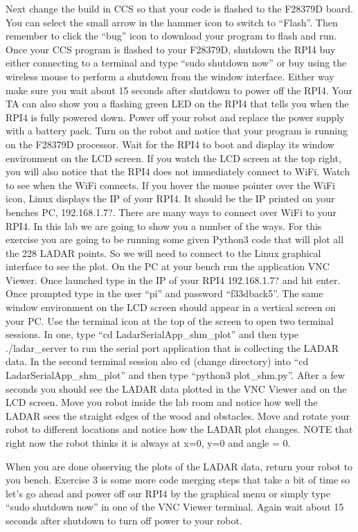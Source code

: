 \documentclass[11pt]{article}
\begin{document}
Next change the build in CCS so that your code is flashed to the F28379D board. You can select the small arrow in the hammer icon to switch to “Flash”. Then remember to click the “bug” icon to download your program to flash and run. Once your CCS program is flashed to your F28379D, shutdown the RPI4 buy either connecting to a terminal and type “sudo shutdown now” or buy using the wireless mouse to perform a shutdown from the window interface. Either way make sure you wait about 15 seconds after shutdown to power off the RPI4. Your TA can also show you a flashing green LED on the RPI4 that tells you when the RPI4 is fully powered down. Power off your robot and replace the power supply with a battery pack. Turn on the robot and notice that your program is running on the F28379D processor. Wait for the RPI4 to boot and display its window environment on the LCD screen. If you watch the LCD screen at the top right, you will also notice that the RPI4 does not immediately connect to WiFi. Watch to see when the WiFi connects. If you hover the mouse pointer over the WiFi icon, Linux displays the IP of your RPI4. It should be the IP printed on your benches PC, 192.168.1.7?. There are many ways to connect over WiFi to your RPI4. In this lab we are going to show you a number of the ways. For this exercise you are going to be running some given Python3 code that will plot all the 228 LADAR points. So we will need to connect to the Linux graphical interface to see the plot. On the PC at your bench run the application VNC Viewer. Once launched type in the IP of your RPI4 192.168.1.7? and hit enter. Once prompted type in the user “pi” and password “f33dback5”. The same window environment on the LCD screen should appear in a vertical screen on your PC. Use the terminal icon at the top of the screen to open two terminal sessions. In one, type “cd LadarSerialApp\_shm\_plot” and then type ./ladar\_server to run the serial port application that is collecting the LADAR data. In the second terminal session also cd (change directory) into “cd LadarSerialApp\_shm\_plot” and then type “python3 plot\_shm.py”. After a few seconds you should see the LADAR data plotted in the VNC Viewer and on the LCD screen. Move you robot inside the lab room and notice how well the LADAR sees the straight edges of the wood and obstacles. Move and rotate your robot to different locations and notice how the LADAR plot changes. NOTE that right now the robot thinks it is always at x=0, y=0 and angle = 0.

When you are done observing the plots of the LADAR data, return your robot to you bench. Exercise 3 is some more code merging steps that take a bit of time so let’s go ahead and power off our RPI4 by the graphical menu or simply type “sudo shutdown now” in one of the VNC Viewer terminal. Again wait about 15 seconds after shutdown to turn off power to your robot.
\end{document}
